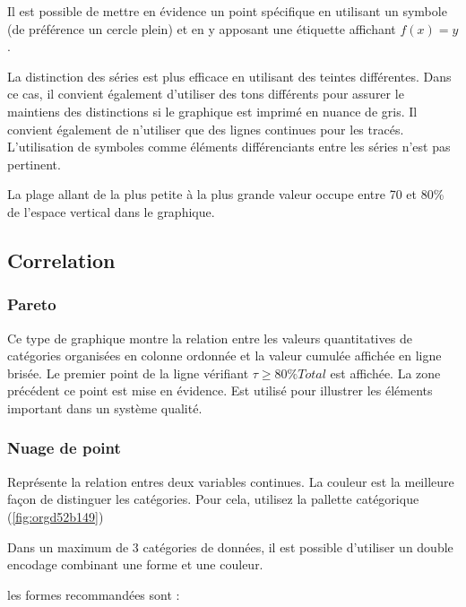 \documentclass[a4paper,12pt]{article}
\begin{document}
\begin{multicols}{2}
Il est possible de mettre en évidence un point spécifique en utilisant un symbole (de préférence un cercle plein) et en y apposant une étiquette affichant \(f(x)=y\).

La distinction des séries est plus efficace en utilisant des teintes différentes. Dans ce cas, il convient également d'utiliser des tons différents pour assurer le maintiens des distinctions si le graphique est imprimé en nuance de gris. \autocite{stephenfewComponentlevelGraphDesign2012}
Il convient également de n'utiliser que des lignes continues pour les tracés. \autocite{stephenfewComponentlevelGraphDesign2012}
L'utilisation de symboles comme éléments différenciants entre les séries n'est pas pertinent. \autocite{stephenfewComponentlevelGraphDesign2012}

La plage allant de la plus petite à la plus grande valeur occupe entre 70 et 80\% de l'espace vertical dans le graphique.\autocite{mikecisnerosWhatLineGraph2024}
\subsection{Correlation}
\label{sec:org17e6e84}
\subsubsection{Pareto}
\label{sec:org40ce750}
Ce type de graphique montre la relation entre les valeurs quantitatives de catégories organisées en colonne ordonnée et la valeur cumulée affichée en ligne brisée. Le premier point de la ligne vérifiant \(\tau\geq80\%Total\) est affichée. La zone précédent ce point est mise en évidence.
Est utilisé pour illustrer les éléments important dans un système qualité.
\subsubsection{Nuage de point}
\label{sec:org92b8184}

Représente la relation entres deux variables continues. \autocite{alansmithLexiqueVisuel}
La couleur est la meilleure façon de distinguer les catégories.\autocite{stephenfewComponentlevelGraphDesign2012} Pour cela, utilisez la pallette catégorique (\ref{fig:orgd52b149})

Dans un maximum de 3 catégories de données, il est possible d'utiliser un double encodage combinant une forme et une couleur.\autocite{andreaskrauseBestPracticesData2024}

les formes recommandées sont :


\end{multicols}
\end{document}
